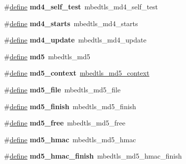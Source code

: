 \begin{DoxyCompactItemize}
\#\hyperlink{structdefine}{define} {\bfseries md4\+\_\+self\+\_\+test}~mbedtls\+\_\+md4\+\_\+self\+\_\+test
\item 
\mbox{\label{compat-1_83_8h_aef321d58e14aaf969ac99814a8de12be}} 
\#\hyperlink{structdefine}{define} {\bfseries md4\+\_\+starts}~mbedtls\+\_\+md4\+\_\+starts
\item 
\mbox{\label{compat-1_83_8h_a0e08aa0a6d65b1563e355f17fbf1afe7}} 
\#\hyperlink{structdefine}{define} {\bfseries md4\+\_\+update}~mbedtls\+\_\+md4\+\_\+update
\item 
\mbox{\label{compat-1_83_8h_a0afe2b38aad3922dbc2d396b8af03d60}} 
\#\hyperlink{structdefine}{define} {\bfseries md5}~mbedtls\+\_\+md5
\item 
\mbox{\label{compat-1_83_8h_a325ed7545ed0e7ae3f0476b72524c2a0}} 
\#\hyperlink{structdefine}{define} {\bfseries md5\+\_\+context}~\hyperlink{structmbedtls__md5__context}{mbedtls\+\_\+md5\+\_\+context}
\item 
\mbox{\label{compat-1_83_8h_ab65d709bbc812ea34dd09e54113220f6}} 
\#\hyperlink{structdefine}{define} {\bfseries md5\+\_\+file}~mbedtls\+\_\+md5\+\_\+file
\item 
\mbox{\label{compat-1_83_8h_a85699062500549162c6947b40e77125a}} 
\#\hyperlink{structdefine}{define} {\bfseries md5\+\_\+finish}~mbedtls\+\_\+md5\+\_\+finish
\item 
\mbox{\label{compat-1_83_8h_a188152fce754e199968f54c0cee4d8fe}} 
\#\hyperlink{structdefine}{define} {\bfseries md5\+\_\+free}~mbedtls\+\_\+md5\+\_\+free
\item 
\mbox{\label{compat-1_83_8h_a5c29496772f93532003a7a8f3d8c0891}} 
\#\hyperlink{structdefine}{define} {\bfseries md5\+\_\+hmac}~mbedtls\+\_\+md5\+\_\+hmac
\item 
\mbox{\label{compat-1_83_8h_a79f052b92ae5978f7f76803c3aee7ee8}} 
\#\hyperlink{structdefine}{define} {\bfseries md5\+\_\+hmac\+\_\+finish}~mbedtls\+\_\+md5\+\_\+hmac\+\_\+finish
\item 
\mbox{\label{compat-1_83_8h_a78633938348a7d9437c87a7df89e1e01}} 

\end{DoxyCompactItemize}
